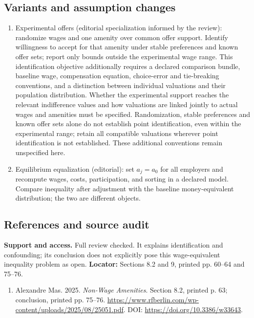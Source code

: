 \documentclass[11pt,a4paper]{article}
\begin{document}
\subsection*{Variants and assumption changes}
\begin{enumerate}
\item Experimental offers (editorial specialization informed by the review): randomize wages and one amenity over common offer support. Identify willingness to accept for that amenity under stable preferences and known offer sets; report only bounds outside the experimental wage range. This identification objective additionally requires a declared comparison bundle, baseline wage, compensation equation, choice-error and tie-breaking conventions, and a distinction between individual valuations and their population distribution. Whether the experimental support reaches the relevant indifference values and how valuations are linked jointly to actual wages and amenities must be specified. Randomization, stable preferences and known offer sets alone do not establish point identification, even within the experimental range; retain all compatible valuations wherever point identification is not established. These additional conventions remain unspecified here.
\item Equilibrium equalization (editorial): set \(a_j=a_0\) for all employers and recompute wages, costs, participation, and sorting in a declared model. Compare inequality after adjustment with the baseline money-equivalent distribution; the two are different objects.
\end{enumerate}
\subsection*{References and source audit}
\textbf{Support and access.} Full review checked. It explains identification and confounding; its conclusion does not explicitly pose this wage-equivalent inequality problem as open. \textbf{Locator:} Sections 8.2 and 9, printed pp. 60--64 and 75--76.
\begin{enumerate}\raggedright
\item\hypertarget{definitions:source:30007637:1}{} Alexandre Mas. 2025. \emph{Non-Wage Amenities}. Section 8.2, printed p. 63; conclusion, printed pp. 75–76.
\url{https://www.rfberlin.com/wp-content/uploads/2025/08/25051.pdf}.
DOI: \url{https://doi.org/10.3386/w33643}.
\end{enumerate}
\end{document}
